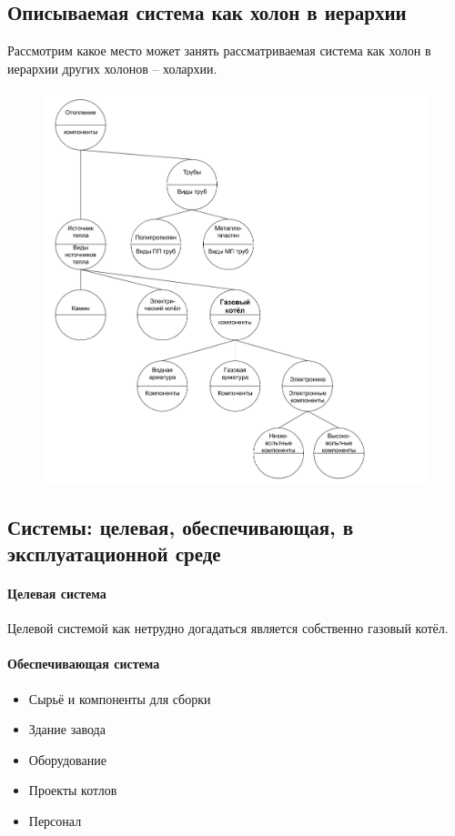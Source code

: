 \documentclass[bibliography=totocnumbered]{scrartcl}
\begin{document}
\subsection{Описываемая система как холон в иерархии}
Рассмотрим какое место может занять рассматриваемая система как холон в иерархии других холонов -- холархии.
\begin{figure}
    \centering \includegraphics[scale=0.5]{hol.png}
\end{figure}
\subsection{Системы: целевая, обеспечивающая, в эксплуатационной среде}

\paragraph{Целевая система}
Целевой системой как нетрудно догадаться является собственно газовый котёл.

\paragraph{Обеспечивающая система}
\begin{itemize}
    \item Сырьё и компоненты для сборки
    \item Здание завода
    \item Оборудование
    \item Проекты котлов
    \item Персонал
\end{itemize}
\end{document}
